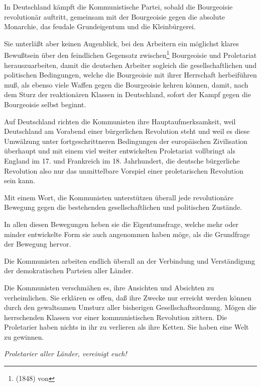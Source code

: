 \documentclass[letterpaper]{article}
\begin{document}
In Deutschland kämpft die Kommunistische Partei, sobald die Bourgeoisie revolutionär auftritt, gemeinsam mit der Bourgeoisie gegen die absolute Monarchie, das feudale Grundeigentum und die Kleinbürgerei.

Sie unterläßt aber keinen Augenblick, bei den Arbeitern ein möglichst klares Bewußtsein über den feindlichen Gegensatz zwischen\footnote{(1848) von} Bourgeoisie und Proletariat herauszuarbeiten, damit die deutschen Arbeiter sogleich die gesellschaftlichen und politischen Bedingungen, welche die Bourgeoisie mit ihrer Herrschaft herbeiführen muß, als ebenso viele Waffen gegen die Bourgeoisie kehren können, damit, nach dem Sturz der reaktionären Klassen in Deutschland, sofort der Kampf gegen die Bourgeoisie selbst beginnt.

Auf Deutschland richten die Kommunisten ihre Hauptaufmerksamkeit, weil Deutschland am Vorabend einer bürgerlichen Revolution steht und weil es diese Umwälzung unter fortgeschrittneren Bedingungen der europäischen Zivilisation überhaupt und mit einem viel weiter entwickelten Proletariat vollbringt als England im 17. und Frankreich im 18. Jahrhundert, die deutsche bürgerliche Revolution also nur das unmittelbare Vorspiel einer proletarischen Revolution sein kann.

Mit einem Wort, die Kommunisten unterstützen überall jede revolutionäre Bewegung gegen die bestehenden gesellschaftlichen und politischen Zustände.

In allen diesen Bewegungen heben sie die Eigentumsfrage, welche mehr oder minder entwickelte Form sie auch angenommen haben möge, als die Grundfrage der Bewegung hervor.

Die Kommunisten arbeiten endlich überall an der Verbindung und Verständigung der demokratischen Parteien aller Länder.

Die Kommunisten verschmähen es, ihre Ansichten und Absichten zu verheimlichen. Sie erklären es offen, daß ihre Zwecke nur erreicht werden können durch den gewaltsamen Umsturz aller bisherigen Gesellschaftsordnung. Mögen die herrschenden Klassen vor einer kommunistischen Revolution zittern. Die Proletarier haben nichts in ihr zu verlieren als ihre Ketten. Sie haben eine Welt zu gewinnen.

\begin{center}
\vspace*{2em}
\textit{\large Proletarier aller Länder, vereinigt euch!}
\end{center}

\newpage
\theendnotes
{}
\end{document}
